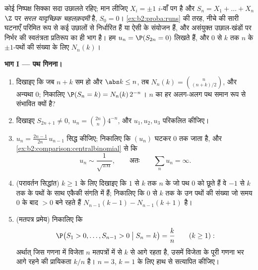\begin{problem}\label{pb:b2:proba:1}
कोई निष्पक्ष सिक्का सदा उछालते रहिए; मान लीजिए $X_i = \pm1$ $i$-वाँ पग है
और $S_n = X_1 + \dots + X_n$ $\Z$ पर \emph{सरल यादृच्छिक चहलक़दमी} है, $S_0 = 0$। \cref{ex:b2:proba:runs} की तरह, नीचे की सारी घटनाएँ परिमित रूप से
कई उछालों से निर्धारित हैं या ऐसी  के  संयोजन हैं, और
असंयुक्त उछाल-खंडों पर निर्भर  की स्वतंत्रता प्रतिरूप का ही
भाग है। हम $u_n =
\P(S_{2n} = 0)$ लिखते हैं, और $0$ से $k$ तक  $n$ के
$\pm1$-पथों की संख्या के लिए $N_n(k)$।

\medskip
\noindent\textbf{भाग I --- पथ गिनना।}
\begin{enumerate}
  \item दिखाइए कि जब $n + k$ सम हो और $\abs k \leq n$, तब $N_n(k) = \binom{n}{(n+k)/2}$, और अन्यथा $0$;
        निकालिए $\P(S_n = k) = N_n(k)\,2^{-n}$।  $n$ का हर अलग-अलग पथ समान रूप से
        संभावित क्यों है?
  \item दिखाइए $S_{2n+1} \neq 0$, $u_n =
        \binom{2n}{n}4^{-n}$, और $u_1, u_2, u_3$ परिकलित कीजिए।
  \item $u_n = \frac{2n-1}{2n}\,u_{n-1}$ सिद्ध कीजिए; निकालिए कि $(u_n)$ घटकर $0$ तक जाता है,
        और \cref{ex:b2:comparison:centralbinomial} से कि
        \[
        u_n \sim \frac{1}{\sqrt{\pi n}},
        \qquad\text{अतः}\qquad
        \sum_n u_n = \infty .
        \]
  \item (परावर्तन सिद्धांत) $k \geq 1$ के लिए दिखाइए कि $1$ से $k$
        तक  $n$ के जो पथ $0$ को छूते हैं वे $-1$ से $k$
        तक के पथों के साथ एकैकी संगति में हैं; निकालिए कि $0$
        से $k$ तक के उन पथों की संख्या जो समय $0$ के बाद $> 0$
        बने रहते हैं $N_{n-1}(k-1) -
        N_{n-1}(k+1)$ है।
  \item (मतपत्र प्रमेय) निकालिए कि
        \[
        \P\bigl(S_1 > 0, \dots, S_{n-1} > 0 \bigm| S_n =
        k\bigr) = \frac kn \qquad (k \geq 1) :
        \]
        अर्थात् जिस गणना में विजेता $n$ मतपत्रों में से $k$
        से आगे रहता है, उसमें विजेता के पूरी गणना भर आगे रहने
        की प्रायिकता $k/n$ है। $n = 3$, $k =
        1$ के लिए हाथ से
        सत्यापित कीजिए।
\end{enumerate}


\end{problem}

